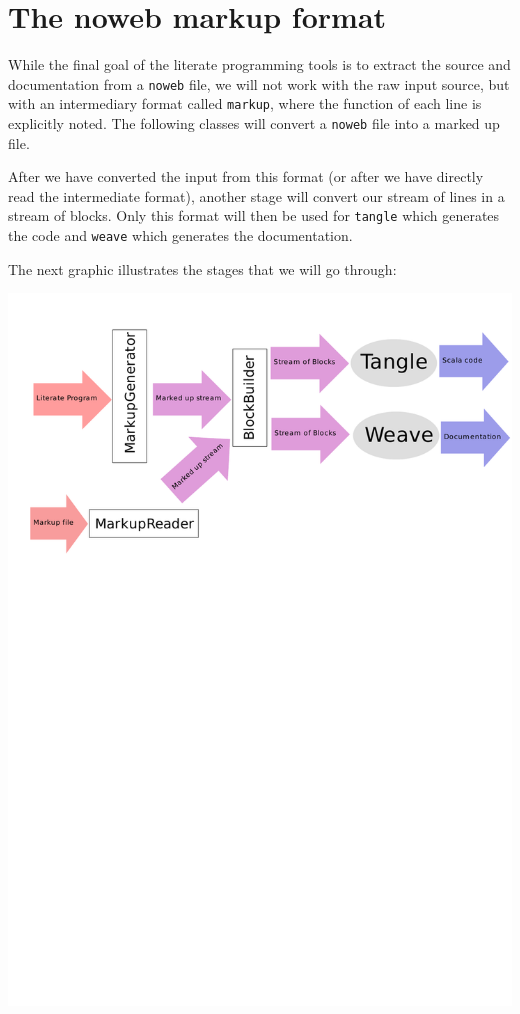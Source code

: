 \documentclass[a4paper,12pt]{article}
\begin{document}
\section{The noweb markup format}
While the final goal of the literate programming tools is to extract the
source and documentation from a \texttt{noweb} file, we will not work with the
raw input source, but with an intermediary format called \texttt{markup}, where
the function of each line is explicitly noted. The following classes will
convert a \texttt{noweb} file into a marked up file.

After we have converted the input from this format (or after we have
directly read the intermediate format), another stage will convert our
stream of lines in a stream of blocks. Only this format will then be used
for \texttt{tangle} which generates the code and \texttt{weave} which generates
the documentation.

The next graphic illustrates the stages that we will go through:

\includegraphics[width=16cm,viewport=0 550 800 800]{images/overview}
\end{document}
